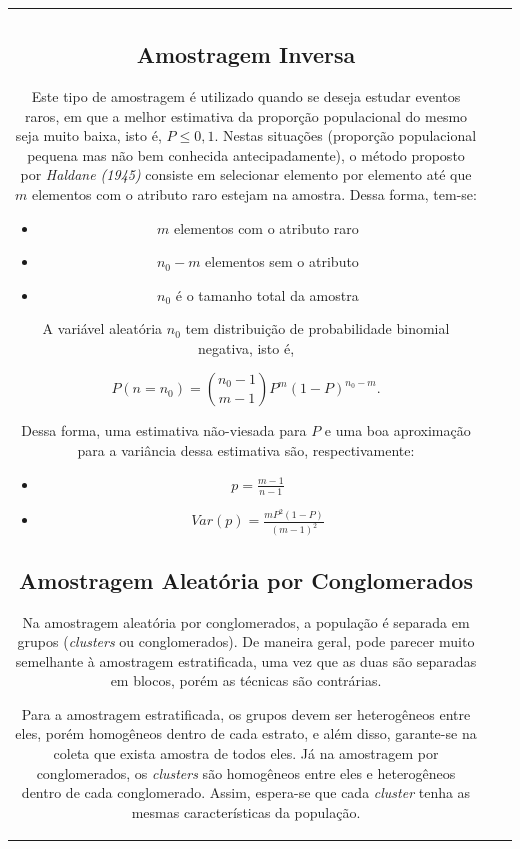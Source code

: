 \documentclass[
]{estat/estat}
\providecommand{\tightlist}{%
  \setlength{\itemsep}{0pt}\setlength{\parskip}{0pt}}\usepackage{longtable,booktabs,array}
\begin{document}
\begin{tabular}{c|cc}
\hypertarget{amostragem-inversa}{%
\subsection{Amostragem Inversa}\label{amostragem-inversa}}

Este tipo de amostragem é utilizado quando se deseja estudar eventos
raros, em que a melhor estimativa da proporção populacional do mesmo
seja muito baixa, isto é, \(P \leq 0,1\). Nestas situações (proporção
populacional pequena mas não bem conhecida antecipadamente), o método
proposto por \emph{Haldane (1945)} consiste em selecionar elemento por
elemento até que \(m\) elementos com o atributo raro estejam na amostra.
Dessa forma, tem-se:

\begin{itemize}
\tightlist
\item
  \(m\) elementos com o atributo raro
\item
  \(n_0 - m\) elementos sem o atributo
\item
  \(n_0\) é o tamanho total da amostra
\end{itemize}

A variável aleatória \(n_0\) tem distribuição de probabilidade binomial
negativa, isto é,

\[
P(n=n_0) = {n_0-1 \choose m-1} P^m (1-P)^{n_0-m}.
\]

Dessa forma, uma estimativa não-viesada para \(P\) e uma boa aproximação
para a variância dessa estimativa são, respectivamente:

\begin{itemize}
\tightlist
\item
  \(p = \frac{m-1}{n-1}\)
\item
  \(Var(p) = \frac{m P^2 (1-P)}{(m-1)^2}\)
\end{itemize}

\hypertarget{amostragem-aleatuxf3ria-por-conglomerados}{%
\subsection{Amostragem Aleatória por
Conglomerados}\label{amostragem-aleatuxf3ria-por-conglomerados}}

Na amostragem aleatória por conglomerados, a população é separada em
grupos (\emph{clusters} ou conglomerados). De maneira geral, pode
parecer muito semelhante à amostragem estratificada, uma vez que as duas
são separadas em blocos, porém as técnicas são contrárias.

Para a amostragem estratificada, os grupos devem ser heterogêneos entre
eles, porém homogêneos dentro de cada estrato, e além disso, garante-se
na coleta que exista amostra de todos eles. Já na amostragem por
conglomerados, os \emph{clusters} são homogêneos entre eles e
heterogêneos dentro de cada conglomerado. Assim, espera-se que cada
\emph{cluster} tenha as mesmas características da população.


\end{tabular}
\end{document}
